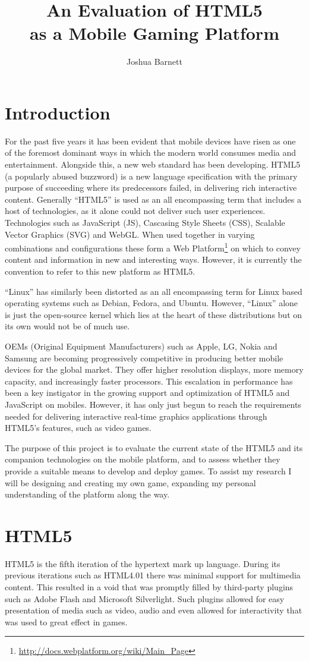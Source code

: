 \documentclass[final]{cmpreport}
\title{An Evaluation of HTML5\\as a Mobile Gaming Platform}
\author{Joshua Barnett}
\begin{document}
\section{Introduction}
For the past five years it has been evident that mobile devices have risen as one of the foremost dominant ways in which the modern world consumes media and entertainment. Alongside this, a new web standard has been developing. HTML5 (a popularly abused buzzword) is a new language specification with the primary purpose of succeeding where its predecessors failed, in delivering rich interactive content. Generally ``HTML5'' is used as an all encompassing term that includes a host of technologies, as it alone could not deliver such user experiences. Technologies such as JavaScript (JS), Cascasing Style Sheets (CSS), Scalable Vector Graphics (SVG) and WebGL. When used together in varying combinations and configurations these form a Web Platform\footnote{\url{http://docs.webplatform.org/wiki/Main_Page}} on which to convey content and information in new and interesting ways. However, it is currently the convention to refer to this new platform as HTML5.

``Linux'' has similarly been distorted as an all encompassing term for Linux based operating systems such as Debian, Fedora, and Ubuntu. However, ``Linux'' alone is just the open-source kernel which lies at the heart of these distributions but on its own would not be of much use.

OEMs (Original Equipment Manufacturers) such as Apple, LG, Nokia and Samsung are becoming progressively competitive in producing better mobile devices for the global market. They offer higher resolution displays, more memory capacity, and increasingly faster processors. This escalation in performance has been a key instigator in the growing support and optimization of HTML5 and JavaScript on mobiles. However, it has only just begun to reach the requirements needed for delivering interactive real-time graphics applications through HTML5's features, such as video games.

The purpose of this project is to evaluate the current state of the HTML5 and its companion technologies on the mobile platform, and to assess whether they provide a suitable means to develop and deploy games. To assist my research I will be designing and creating my own game, expanding my personal understanding of the platform along the way.

\section{HTML5}
HTML5 is the fifth iteration of the hypertext mark up language. During its previous iterations such as HTML4.01 there was minimal support for multimedia content. This resulted in a void that was promptly filled by third-party plugins such as Adobe Flash and Microsoft Silverlight. Such plugins allowed for easy presentation of media such as video, audio and even allowed for interactivity that was used to great effect in games.
\end{document}
